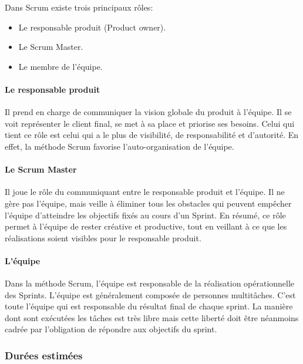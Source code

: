 Dans Scrum existe trois principaux rôles:

\begin{itemize}
    \item Le responsable produit (Product owner).
    \item Le Scrum Master.
    \item Le membre de l'équipe.
\end{itemize}

\paragraph{Le responsable produit}

Il prend en charge de communiquer la vision globale du produit à l'équipe. Il
se voit représenter le client final, se met à sa place et priorise ses besoins.
Celui qui tient ce rôle est celui qui a le plus de visibilité, de
responsabilité et d'autorité. En effet, la méthode Scrum favorise
l'auto-organisation de l'équipe.

\paragraph{Le Scrum Master}

Il joue le rôle du communiquant entre le responsable produit et l'équipe. Il ne
gère pas l'équipe, mais veille à éliminer tous les obstacles qui peuvent
empêcher l'équipe d'atteindre les objectifs fixés au cours d'un Sprint. En
résumé, ce rôle permet à l'équipe de rester créative et productive, tout en
veillant à ce que les réalisations soient visibles pour le responsable produit.

\paragraph{L'équipe}

Dans la méthode Scrum, l'équipe est responsable de la réalisation
opérationnelle des Sprints. L'équipe est généralement composée de personnes
multitâches. C'est toute l'équipe qui est responsable du résultat final de
chaque sprint. La manière dont sont exécutées les tâches est très libre mais
cette liberté doit être néanmoins cadrée par l'obligation de répondre aux
objectifs du sprint.

\subsubsection{Durées estimées}

